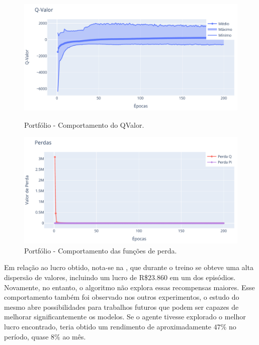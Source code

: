 \begin{figure}[htbp]
    \centering 
    \begin{minipage}[b]{0.45\linewidth}
        \includegraphics[width=\linewidth]{img/ddpg/all/clean/qval}
        \caption{Portfólio - Comportamento do QValor.} 
        \label{all_clean_qval}
    \end{minipage}
    \quad
    \begin{minipage}[b]{0.45\linewidth}
        \includegraphics[width=\linewidth]{img/ddpg/all/clean/loss}
        \caption{Portfólio - Comportamento das funções de perda.}
        \label{all_clean_loss}
    \end{minipage}
\end{figure}

Em relação ao lucro obtido, nota-se na , que durante o treino se obteve uma alta dispersão de valores, incluindo um lucro de R\$$23.860$ em um dos episódios. Novamente, no entanto, o algoritmo não explora essas recompensas maiores. Esse comportamento também foi observado nos outros experimentos, o estudo do mesmo abre possibilidades para trabalhos futuros que podem ser capazes de melhorar significantemente os modelos. Se o agente tivesse explorado o melhor lucro encontrado, teria obtido um rendimento de aproximadamente $47\%$ no período, quase $8\%$ ao mês.  

